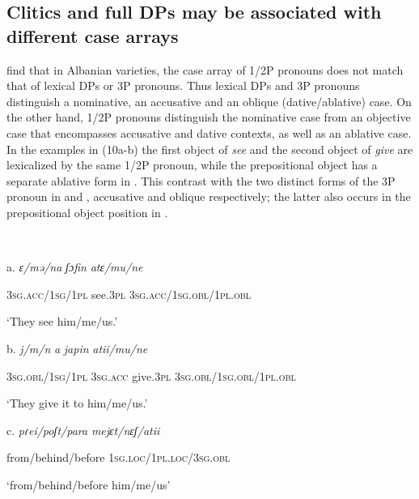 \documentclass[output=paper]{langscibook}
\begin{document}
\subsection{ Clitics and full DPs may be associated with different case arrays}  %

\citet{ManziniSavoia2014} find that in Albanian varieties, the case array of 1/2P pronouns does not match that of lexical DPs or 3P pronouns. Thus lexical DPs and 3P pronouns distinguish a nominative, an accusative and an oblique (dative/ablative) case. On the other hand, 1/2P pronouns distinguish the nominative case from an objective case that encompasses accusative and dative contexts, as well as an ablative case. In the examples in (10a-b) the first object of \textit{see} and the second object of \textit{give} are lexicalized by the same 1/2P pronoun, while the prepositional object has a separate ablative form in . This contrast with the two distinct forms of the 3P pronoun in  and , accusative and oblique respectively; the latter also occurs in the prepositional object position in .  

\ea\label{ex:key:}
{}\\
\z

a.  \textit{ɛ/mə/na}      \textit{ʃɔfin}    \textit{atɛ/mu/ne}   

  \textsc{3sg.acc/1sg/1pl}    see.\textsc{3pl} \textsc{3sg.acc/1sg.obl/1pl.obl}

  ‘They see him/me/us.’

  b.  \textit{j/m/n}       \textit{a}   \textit{japin}    \textit{atii/mu/ne}

        \textsc{3sg.obl/1sg/1pl} \textsc{3sg.acc} give.\textsc{3pl}  \textsc{3sg.obl/1sg.obl/1pl.obl}

  ‘They give it to him/me/us.’

  c.  \textit{pɾei/poʃt/para}     \textit{mejɛt/nɛʃ/atii}

from/behind/before \textsc{1sg.loc/1pl.loc/3sg.obl}

  ‘from/behind/before him/me/us’
\end{document}
